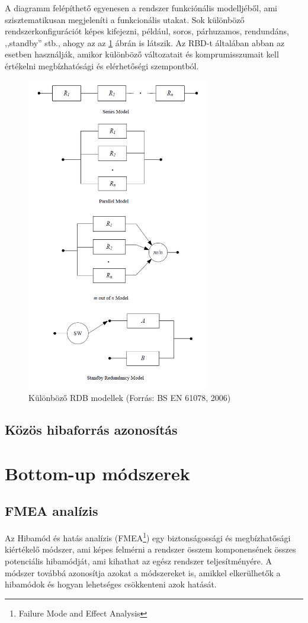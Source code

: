 A diagramm felépíthető egyenesen a rendszer funkciónális modelljéből, ami szisztematikusan megjeleníti a funkcionális utakat.
Sok különböző rendszerkonfigurációt képes kifejezni, például, soros, párhuzamos, rendundáns, ,,standby'' stb., ahogy az az \ref{fig:rdb} ábrán is látszik.
Az RBD-t általában abban az esetben használják, amikor különböző változatait és komprumisszumait kell értékelni megbízhatósági és elérhetőségi szempontból.
\begin{figure}
    \footnotesize
    \centering
    \includegraphics[width=80mm, keepaspectratio]{figures/rbd1.png}
    \caption{Különböző RDB modellek (Forrás: BS EN 61078, 2006)}
    \label{fig:rdb}
\end{figure}

\subsection{Közös hibaforrás azonosítás}

\section{Bottom-up módszerek}
\subsection{FMEA analízis}
Az Hibamód és hatás analízis (FMEA\footnote{Failure Mode and Effect Analysis}) egy biztonságossági és megbízhatősági kiértékelő módszer, ami képes felmérni a rendszer összem komponensének összes potenciális hibamódját, ami kihathat az egész rendszer teljesítményére.
A módszer továbbá azonosítja azokat a módszereket is, amikkel elkerülhetők a hibamódok és hogyan lehetséges csökkenteni azok hatását.

